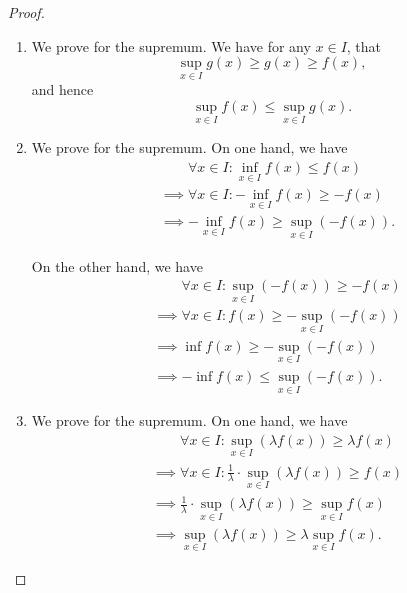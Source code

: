 \documentclass[11pt]{article}
\numberwithin{equation}{section}
\theoremstyle{definition}
\theoremstyle{remark}
\newcommand{\pqty}[1]{\left(#1\right)}
\begin{document}
\begin{proof}
    \begin{enumerate}
        \item We prove for the supremum. We have for any \(x \in I\), that
        \[
            \sup_{x \in I} g\pqty{x} \geq g\pqty{x} \geq f\pqty{x},
        \]
        and hence
        \[
            \sup_{x \in I} f\pqty{x} \leq \sup_{x \in I} g\pqty{x}.
        \]

        \item We prove for the supremum. On one hand, we have
        \begin{align*}
            &\phantom{\implies} \forall x \in I: \inf_{x \in I} f\pqty{x} \leq f\pqty{x} \\
            &\implies \forall x \in I: - \inf_{x \in I} f\pqty{x} \geq -f\pqty{x} \\
            &\implies - \inf_{x \in I} f\pqty{x} \geq \sup_{x \in I} \pqty{- f\pqty{x}}.
        \end{align*}

        On the other hand, we have
        \begin{align*}
            &\phantom{\implies} \forall x \in I: \sup_{x \in I} \pqty{- f\pqty{x}} \geq -f\pqty{x} \\
            &\implies \forall x \in I: f\pqty{x} \geq -\sup_{x \in I} \pqty{- f\pqty{x}}  \\
            &\implies \inf f\pqty{x} \geq - \sup_{x \in I} \pqty{- f\pqty{x}} \\
            &\implies - \inf f\pqty{x} \leq \sup_{x \in I} \pqty{- f\pqty{x}}.
        \end{align*}

        \item We prove for the supremum. On one hand, we have
        \begin{align*}
            &\phantom{\implies} \forall x \in I: \sup_{x \in I} \pqty{\lambda f\pqty{x}} \geq \lambda f\pqty{x} \\
            &\implies \forall x \in I: \frac{1}{\lambda} \cdot \sup_{x \in I} \pqty{\lambda f\pqty{x}} \geq f\pqty{x} \\
            &\implies \frac{1}{\lambda} \cdot \sup_{x \in I} \pqty{\lambda f\pqty{x}} \geq \sup_{x \in I} f\pqty{x} \\
            &\implies \sup_{x \in I} \pqty{\lambda f\pqty{x}} \geq \lambda \sup_{x \in I} f\pqty{x}.
        \end{align*}


\end{enumerate}
\end{proof}
\end{document}
